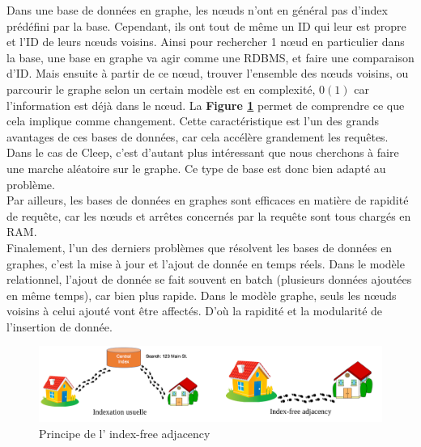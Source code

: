 \documentclass{article} %
\begin{document}
Dans une base de données en graphe, les nœuds n'ont en général pas d'index prédéfini par la base. Cependant, ils ont tout de même un ID qui leur est propre et l'ID de leurs nœuds voisins. Ainsi pour rechercher 1 nœud en particulier dans la base, une base en graphe va agir comme une RDBMS, et faire une comparaison d'ID. Mais ensuite à partir de ce nœud, trouver l'ensemble des nœuds voisins, ou parcourir le graphe selon un certain modèle est en complexité, $0(1)$ car l'information est déjà dans le nœud. La \textbf{Figure \ref{fig:indfree}} permet de comprendre ce que cela implique comme changement. Cette caractéristique est l'un des grands avantages de ces bases de données, car cela accélère grandement les requêtes. Dans le cas de Cleep, c'est d'autant plus intéressant que nous cherchons à faire une marche aléatoire sur le graphe. Ce type de base est donc bien adapté au problème.\\
Par ailleurs, les bases de données en graphes sont efficaces en matière de rapidité de requête, car les nœuds et arrêtes concernés par la requête sont tous chargés en RAM.\\
Finalement, l'un des derniers problèmes que résolvent les bases de données en graphes, c'est la mise à jour et l'ajout de donnée en temps réels. Dans le modèle relationnel, l'ajout de donnée se fait souvent en batch (plusieurs données ajoutées en même temps), car bien plus rapide. Dans le modèle graphe, seuls les nœuds voisins à celui ajouté vont être affectés. D'où la rapidité et la modularité de l'insertion de donnée.\\

\begin{figure}[!h]
 \centering
 \includegraphics[keepaspectratio = true,scale=0.3]{indfree.png}
 \caption{Principe de l’ index-free adjacency}
 \label{fig:indfree}
\end{figure}
\end{document}
